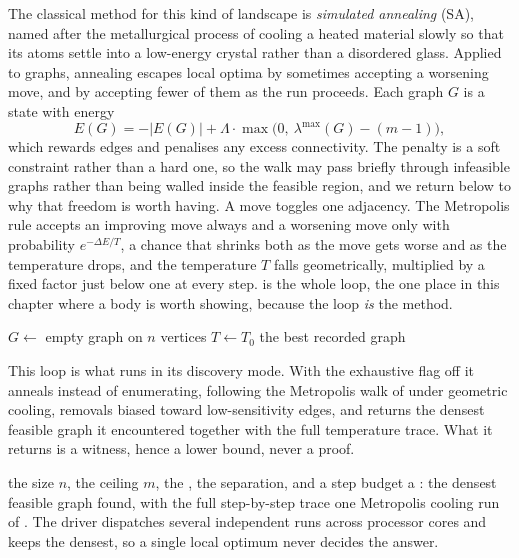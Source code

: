 The classical method for this kind of landscape is \emph{simulated annealing} (SA), named after the metallurgical process of cooling a heated material slowly so that its atoms settle into a low-energy crystal rather than a disordered glass. Applied to graphs, annealing escapes local optima by sometimes accepting a worsening move, and by accepting fewer of them as the run proceeds. Each graph $G$ is a state with energy
\[
    E(G) = -|E(G)| + \Lambda \cdot \max\bigl(0,\ \lambda^{\max}(G) - (m - 1)\bigr),
\]
which rewards edges and penalises any excess connectivity. The penalty is a soft constraint rather than a hard one, so the walk may pass briefly through infeasible graphs rather than being walled inside the feasible region, and we return below to why that freedom is worth having. A move toggles one adjacency. The Metropolis rule accepts an improving move always and a worsening move only with probability $e^{-\Delta E / T}$, a chance that shrinks both as the move gets worse and as the temperature drops, and the temperature $T$ falls geometrically, multiplied by a fixed factor just below one at every step.  is the whole loop, the one place in this chapter where a body is worth showing, because the loop \emph{is} the method.

\begin{algorithm}[t]
\caption{Temperature search for a dense feasible graph}\label{alg:anneal}
$G \gets$ empty graph on $n$ vertices\;
$T \gets T_0$\;
\Return the best recorded graph\;
\end{algorithm}

This loop is what  runs in its discovery mode. With the exhaustive flag off it anneals instead of enumerating, following the Metropolis walk of  under geometric cooling, removals biased toward low-sensitivity edges, and returns the densest feasible graph it encountered together with the full temperature trace. What it returns is a witness, hence a lower bound, never a proof.

{the size $n$, the ceiling $m$, the , the separation, and a step budget}
{a : the densest feasible graph found, with the full step-by-step trace}
{one Metropolis cooling run of . The driver  dispatches several independent runs across processor cores and keeps the densest, so a single local optimum never decides the answer.}

